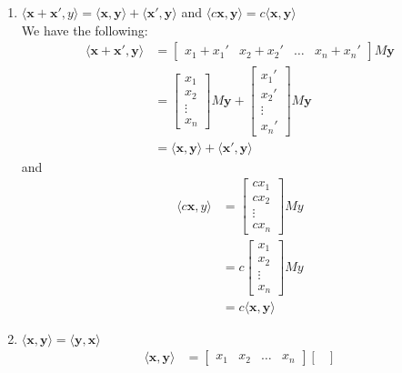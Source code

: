 \documentclass[12pt]{article}
\begin{document}
\begin{enumerate}
\item $\langle \mathbf x +\mathbf x',y\rangle = \langle\mathbf x, \mathbf y\rangle + \langle\mathbf x',\mathbf y\rangle $ and $\langle c\mathbf x,\mathbf y\rangle = c\langle \mathbf x,\mathbf y\rangle$\\
	We have the following: 
	\begin{align*}
	\langle\mathbf x +\mathbf x',\mathbf y\rangle &= \begin{bmatrix}
	x_1+x_1' &
	x_2 + x_2' &
	\ldots &
	x_n+x_n'
	\end{bmatrix} M\mathbf y\\
&= \begin{bmatrix}
x_1\\
x_2\\
\vdots\\
x_n
\end{bmatrix}M\mathbf y + \begin{bmatrix}
x_1'\\
x_2'\\
\vdots\\
x_n'
\end{bmatrix}M\mathbf y\\
&=\langle\mathbf x,\mathbf y\rangle + \langle\mathbf x',\mathbf y\rangle
	\end{align*}
and \begin{align*}
\langle c\mathbf x, y\rangle &= \begin{bmatrix}
cx_1\\
cx_2\\
\vdots\\
cx_n
\end{bmatrix}My\\
&= c\begin{bmatrix}
x_1\\
x_2\\
\vdots\\
x_n
\end{bmatrix}My\\
&=c\langle\mathbf x,\mathbf y\rangle
\end{align*}
\item $\langle\mathbf x,\mathbf y\rangle = \langle\mathbf y,\mathbf x \rangle$\\
\begin{align*}
\langle \mathbf x,\mathbf y\rangle &= \begin{bmatrix}
x_1 &
x_2 &
\ldots &
x_n
\end{bmatrix}\begin{bmatrix}

\end{bmatrix}
\end{align*}
\end{enumerate}
\end{document}
